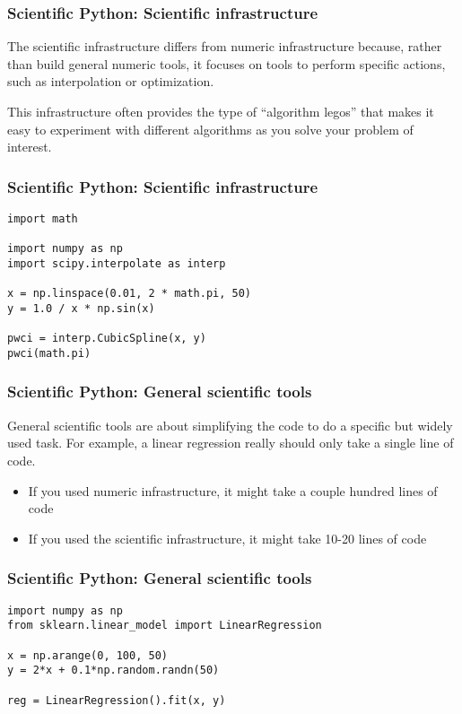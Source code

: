 \documentclass[
    xcolor={svgnames,dvipsnames},
    hyperref={colorlinks, citecolor=DeepPink4, linkcolor=DarkRed, urlcolor=DarkBlue}
]{beamer}  %
\newcommand{\1}{\mathbbm 1}
\begin{document}
\begin{frame}[fragile]
    \frametitle{Scientific Python: Scientific infrastructure}

    The scientific infrastructure differs from numeric infrastructure because, rather than build
    general numeric tools, it focuses on tools to perform specific actions, such as interpolation
    or optimization.

    This infrastructure often provides the type of ``algorithm legos'' that makes it easy to
    experiment with different algorithms as you solve your problem of interest.

\end{frame}

\begin{frame}[fragile]
    \frametitle{Scientific Python: Scientific infrastructure}
    \begin{verbatim}
import math

import numpy as np
import scipy.interpolate as interp

x = np.linspace(0.01, 2 * math.pi, 50)
y = 1.0 / x * np.sin(x)

pwci = interp.CubicSpline(x, y)
pwci(math.pi)

    \end{verbatim}

\end{frame}

\begin{frame}[fragile]
    \frametitle{Scientific Python: General scientific tools}

    General scientific tools are about simplifying the code to do a specific but widely used task.
    For example, a linear regression really should only take a single line of code.

    \begin{itemize}
        \item If you used numeric infrastructure, it might take a couple hundred lines of code
        \item If you used the scientific infrastructure, it might take 10-20 lines of code
    \end{itemize}

\end{frame}

\begin{frame}[fragile]
    \frametitle{Scientific Python: General scientific tools}

    \begin{verbatim}
import numpy as np
from sklearn.linear_model import LinearRegression

x = np.arange(0, 100, 50)
y = 2*x + 0.1*np.random.randn(50)

reg = LinearRegression().fit(x, y)

    \end{verbatim}

\end{frame}
\end{document}
